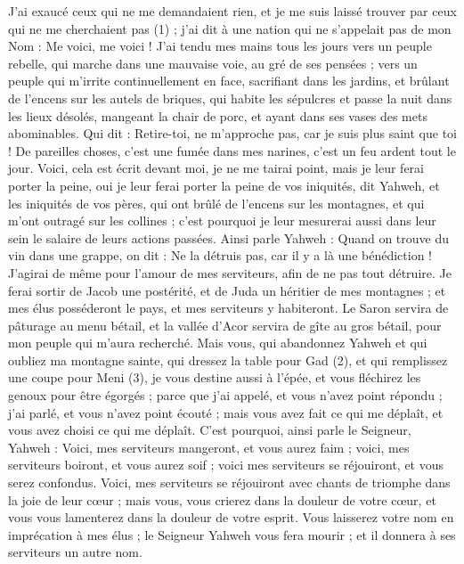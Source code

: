 \begin{multicols}{2}
\VerseOne{}J’ai exaucé ceux qui ne me demandaient rien, et je me suis laissé trouver par ceux qui ne me cherchaient pas (1) ; j'ai dit à une nation qui ne s'appelait pas de mon Nom : Me voici, me voici !
J'ai tendu mes mains tous les jours vers un peuple rebelle, qui marche dans une mauvaise voie, au gré de ses pensées ;
vers un peuple qui m'irrite continuellement en face, sacrifiant dans les jardins, et brûlant de l’encens sur les autels de briques,
qui habite les sépulcres et passe la nuit dans les lieux désolés, mangeant la chair de porc, et ayant dans ses vases des mets abominables.
Qui dit : Retire-toi, ne m’approche pas, car je suis plus saint que toi ! De pareilles choses, c’est une fumée dans mes narines, c’est un feu ardent tout le jour.
Voici, cela est écrit devant moi, je ne me tairai point, mais je leur ferai porter la peine, oui je leur ferai porter la peine
de vos iniquités, dit Yahweh, et les iniquités de vos pères, qui ont brûlé de l’encens sur les montagnes, et qui m’ont outragé sur les collines ; c'est pourquoi je leur mesurerai aussi dans leur sein le salaire de leurs actions passées.
Ainsi parle Yahweh : Quand on trouve du vin dans une grappe, on dit : Ne la détruis pas, car il y a là une bénédiction ! J’agirai de même pour l’amour de mes serviteurs, afin de ne pas tout détruire.
Je ferai sortir de Jacob une postérité, et de Juda un héritier de mes montagnes ; et mes élus posséderont le pays, et mes serviteurs y habiteront.
Le Saron servira de pâturage au menu bétail, et la vallée d’Acor servira de gîte au gros bétail, pour mon peuple qui m'aura recherché.
Mais vous, qui abandonnez Yahweh et qui oubliez ma montagne sainte, qui dressez la table pour Gad (2), et qui remplissez une coupe pour Meni (3),
je vous destine aussi à l'épée, et vous fléchirez les genoux pour être égorgés ; parce que j'ai appelé, et vous n'avez point répondu ; j'ai parlé, et vous n'avez point écouté ; mais vous avez fait ce qui me déplaît, et vous avez choisi ce qui me déplaît.
C'est pourquoi, ainsi parle le Seigneur, Yahweh : Voici, mes serviteurs mangeront, et vous aurez faim ; voici, mes serviteurs boiront, et vous aurez soif ; voici mes serviteurs se réjouiront, et vous serez confondus.
Voici, mes serviteurs se réjouiront avec chants de triomphe dans la joie de leur cœur ; mais vous, vous crierez dans la douleur de votre cœur, et vous vous lamenterez dans la douleur de votre esprit.
Vous laisserez votre nom en imprécation à mes élus ; le Seigneur Yahweh vous fera mourir ; et il donnera à ses serviteurs un autre nom.

\end{multicols}
